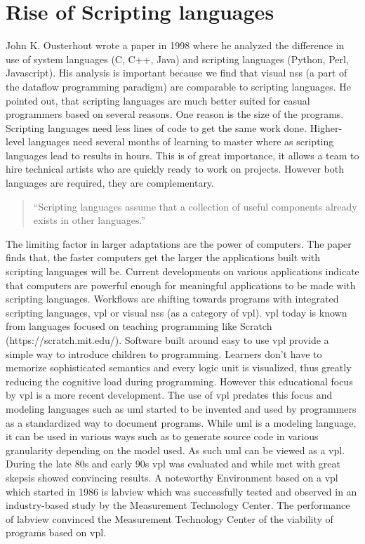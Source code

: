 \documentclass[10pt,a4paper]{article}
\begin{document}
\section{Rise of Scripting languages}\label{sec:scriptingLanguages}
\begin{multicols}{2}
John K. Ousterhout wrote a paper\cite{Ousterhout1998} in 1998 where he analyzed the difference in use of system languages (C, C++, Java) and scripting languages (Python, Perl, Javascript). His analysis is important because we find that visual \gls{ns}s (a part of the dataflow programming paradigm\cite{wiki:Dataflow}) are comparable to scripting languages. He pointed out, that scripting languages are much better suited for casual programmers based on several reasons. One reason is the size of the programs. Scripting languages need less lines of code to get the same work done. Higher-level languages need several months of learning to master where as scripting languages lead to results in hours. This is of great importance, it allows a team to hire technical artists who are quickly ready to work on projects. However both languages are required, they are complementary.\begin{quote}
“Scripting languages assume that a collection of useful components already exists in other languages.”\citep[p.~2]{Ousterhout1998}
\end{quote}
The limiting factor in larger adaptations are the power of computers. The paper finds that, the faster computers get the larger the applications built with scripting languages will be. Current developments on various applications indicate that computers are powerful enough for meaningful applications to be made with scripting languages. Workflows are shifting towards programs with integrated scripting languages, \gls{vpl} or visual \gls{ns}s (as a category of \gls{vpl}).
\gls{vpl} today is known from languages focused on teaching programming like Scratch (https://scratch.mit.edu/). Software built around easy to use \gls{vpl} provide a simple way to introduce children to programming. Learners don’t have to memorize sophisticated semantics and every logic unit is visualized, thus greatly reducing the cognitive load during programming. However this educational focus by \gls{vpl} is a more recent development. The use of \gls{vpl} predates this focus and modeling languages such as \gls{uml} started to be invented and used by programmers as a standardized way to document programs. While \gls{uml} is a modeling language, it can be used in various ways such as to generate source code\cite{VisualStudioDocsContributors2016} in various granularity depending on the model used. As such \gls{uml} can be viewed as a \gls{vpl}. During the late 80s and early 90s \gls{vpl} was evaluated and while met with great skepsis showed convincing results\cite{WHITLEY1997}. A noteworthy Environment based on a \gls{vpl} which started in 1986 is \gls{labview} which was successfully tested and observed in an industry-based study by the Measurement Technology Center\cite{Jamal}. The performance of \gls{labview} convinced the Measurement Technology Center of the viability of programs based on \gls{vpl}.

\end{multicols}
\end{document}
